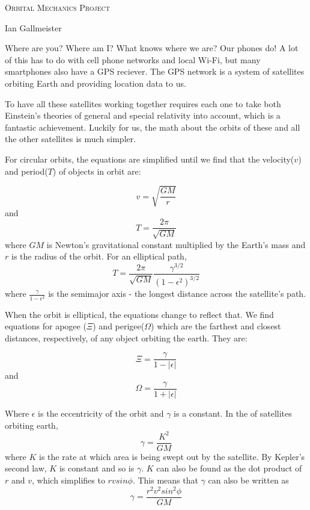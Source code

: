 \documentclass{article}
\begin{document}
\textsc{\large{Orbital Mechanics Project}}

\bigskip

Ian Gallmeister

\bigskip



Where are you?  Where am I?  What knows where we are?  Our phones do!  A lot of this has to do with cell phone networks and local Wi-Fi, but many smartphones also have a GPS reciever.  The GPS network is a system of satellites orbiting Earth and providing location data to us.

To have all these satellites working together requires each one to take both Einstein's theories of general and special relativity into account, which is a fantastic achievement.  Luckily for us, the math about the orbits of these and all the other satellites is much simpler.

For circular orbits, the equations are simplified until we find that the velocity($v$) and period($T$) of objects in orbit are:

$$v = \sqrt{\frac{GM}{r}}$$ and $$T = \frac{2\pi}{\sqrt{GM}}$$  where $GM$ is Newton's gravitational constant multiplied by the Earth's mass and $r$ is the radius of the orbit.  For an elliptical path, $$T = \frac{2\pi}{\sqrt{GM}}\frac{\gamma^{3/2}}{(1-\epsilon^2)^{3/2}}$$ where $\frac{\gamma}{1 - \epsilon^2}$ is the semimajor axis - the longest distance across the satellite's path.

When the orbit is elliptical, the equations change to reflect that.  We find equations for apogee ($\Xi$) and perigee($\Omega$) which are the farthest and closest distances, respectively, of any object orbiting the earth.  They are:

$$\Xi = \frac{\gamma}{1 - |\epsilon|}$$ and $$\Omega = \frac{\gamma}{1 + |\epsilon|}$$

Where $\epsilon$ is the eccentricity of the orbit and $\gamma$ is a constant.  In the of satellites orbiting earth, $$\gamma = \frac{K^2}{GM}$$ where $K$ is the rate at which area is being swept out by the satellite.  By Kepler's second law, $K$ is constant and so is $\gamma$.  $K$ can also be found as the dot product of $r$ and $v$, which simplifies to $rvsin{\phi}$.  This means that $\gamma$ can also be written as $$\gamma = \frac{r^2v^2sin^2{\phi}}{GM}$$
\end{document}
